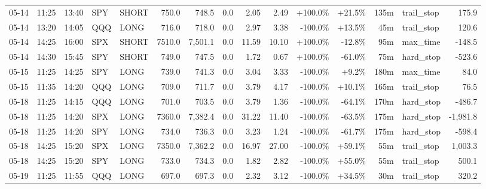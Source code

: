 \documentclass[11pt,a4paper,twoside]{article}
\begin{document}
\begin{landscape}
\begin{center}
\begin{longtable}{>{\color{txtmain}}l l l l l r r r r r r r r >{\color{txtmain}}l r}
05-14 & 11:25 & 13:40 & SPY & SHORT & 750.0 & 748.5 & 0.0 & 2.05 & 2.49 & \textcolor{wingreen}{+100.0\%} & \textcolor{wingreen}{+21.5\%} & 135m & trail\_stop & \textcolor{wingreen}{175.9} \\
05-14 & 13:20 & 14:05 & QQQ & LONG & 716.0 & 718.0 & 0.0 & 2.97 & 3.38 & \textcolor{lossred}{-100.0\%} & \textcolor{wingreen}{+13.5\%} & 45m & trail\_stop & \textcolor{wingreen}{120.6} \\
05-14 & 14:25 & 16:00 & SPX & SHORT & 7510.0 & 7,501.1 & 0.0 & 11.59 & 10.10 & \textcolor{wingreen}{+100.0\%} & \textcolor{lossred}{-12.8\%} & 95m & max\_time & \textcolor{lossred}{-148.5} \\
05-14 & 14:30 & 15:45 & SPY & SHORT & 749.0 & 747.5 & 0.0 & 1.72 & 0.67 & \textcolor{wingreen}{+100.0\%} & \textcolor{lossred}{-61.0\%} & 75m & hard\_stop & \textcolor{lossred}{-523.6} \\
05-15 & 11:25 & 14:25 & SPY & LONG & 739.0 & 741.3 & 0.0 & 3.04 & 3.33 & \textcolor{lossred}{-100.0\%} & \textcolor{wingreen}{+9.2\%} & 180m & max\_time & \textcolor{wingreen}{84.0} \\
05-15 & 11:35 & 14:20 & QQQ & LONG & 709.0 & 711.7 & 0.0 & 3.79 & 4.17 & \textcolor{lossred}{-100.0\%} & \textcolor{wingreen}{+10.1\%} & 165m & trail\_stop & \textcolor{wingreen}{76.5} \\
05-18 & 11:25 & 14:15 & QQQ & LONG & 701.0 & 703.5 & 0.0 & 3.79 & 1.36 & \textcolor{lossred}{-100.0\%} & \textcolor{lossred}{-64.1\%} & 170m & hard\_stop & \textcolor{lossred}{-486.7} \\
05-18 & 11:25 & 14:20 & SPX & LONG & 7360.0 & 7,382.4 & 0.0 & 31.22 & 11.40 & \textcolor{lossred}{-100.0\%} & \textcolor{lossred}{-63.5\%} & 175m & hard\_stop & \textcolor{lossred}{-1,981.8} \\
05-18 & 11:25 & 14:20 & SPY & LONG & 734.0 & 736.3 & 0.0 & 3.23 & 1.24 & \textcolor{lossred}{-100.0\%} & \textcolor{lossred}{-61.7\%} & 175m & hard\_stop & \textcolor{lossred}{-598.4} \\
05-18 & 14:25 & 15:20 & SPX & LONG & 7350.0 & 7,362.2 & 0.0 & 16.97 & 27.00 & \textcolor{lossred}{-100.0\%} & \textcolor{wingreen}{+59.1\%} & 55m & trail\_stop & \textcolor{wingreen}{1,003.3} \\
05-18 & 14:25 & 15:20 & SPY & LONG & 733.0 & 734.3 & 0.0 & 1.82 & 2.82 & \textcolor{lossred}{-100.0\%} & \textcolor{wingreen}{+55.0\%} & 55m & trail\_stop & \textcolor{wingreen}{500.1} \\
05-19 & 11:25 & 11:55 & QQQ & LONG & 697.0 & 697.3 & 0.0 & 2.32 & 3.12 & \textcolor{lossred}{-100.0\%} & \textcolor{wingreen}{+34.5\%} & 30m & trail\_stop & \textcolor{wingreen}{320.2} \\

\end{longtable}
\end{center}
\end{landscape}
\end{document}

